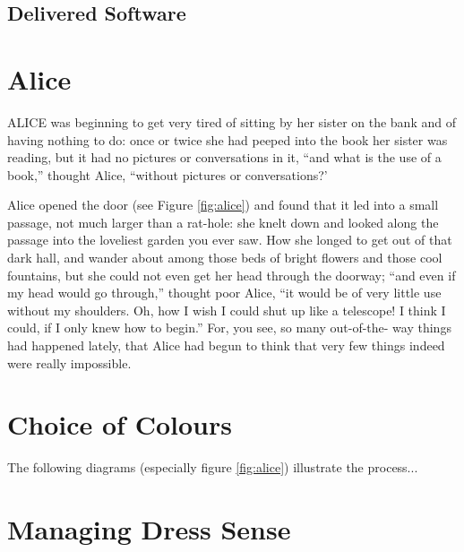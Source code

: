 \documentclass{l3proj}
\begin{document}
\subsection{Delivered Software}
\label{finsoftware}

\newpage

\section{Alice}
\label{sec:alice}

ALICE \cite{alice} was beginning to get very tired of sitting by her sister
on the bank and of having nothing to do: once or twice she had peeped into
the book her sister was reading, but it had no pictures or conversations in
it, ``and what is the use of a book,'' thought Alice, ``without pictures or
conversations?'



Alice opened the door (see Figure \ref{fig:alice}) and found that it
led into a small passage, not much larger than a rat-hole: she knelt
down and looked along the passage into the loveliest garden you ever
saw. How she longed to get out of that dark hall, and wander about
among those beds of bright flowers and those cool fountains, but she
could not even get her head through the doorway; ``and even if my head
would go through,'' thought poor Alice, ``it would be of very little
use without my shoulders. Oh, how I wish I could shut up like a
telescope! I think I could, if I only knew how to begin.'' For, you
see, so many out-of-the- way things had happened lately, that Alice
had begun to think that very few things indeed were really impossible.


\section{Choice of Colours}
\label{design}

The following diagrams (especially figure \ref{fig:alice}) illustrate the
process...

\section{Managing Dress Sense}
\label{managing}
\end{document}
